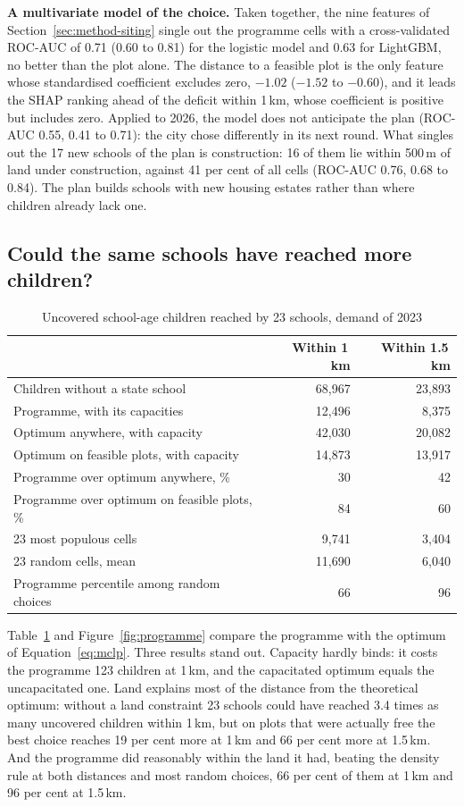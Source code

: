 \textbf{A multivariate model of the choice.} Taken together, the nine features of Section~\ref{sec:method-siting} single out the programme cells with a cross-validated ROC-AUC of 0.71 (0.60 to 0.81) for the logistic model and 0.63 for LightGBM, no better than the plot alone. The distance to a feasible plot is the only feature whose standardised coefficient excludes zero, $-1.02$ ($-1.52$ to $-0.60$), and it leads the SHAP ranking ahead of the deficit within 1\,km, whose coefficient is positive but includes zero. Applied to 2026, the model does not anticipate the plan (ROC-AUC 0.55, 0.41 to 0.71): the city chose differently in its next round. What singles out the 17 new schools of the plan is construction: 16 of them lie within 500\,m of land under construction, against 41 per cent of all cells (ROC-AUC 0.76, 0.68 to 0.84). The plan builds schools with new housing estates rather than where children already lack one.

\subsection{Could the same schools have reached more children?}

\begin{table}[ht]
\centering
\caption{Uncovered school-age children reached by 23 schools, demand of 2023}
\label{tab:backtest}
\small
\begin{tabular}{lrr}
\toprule
& Within 1\,km & Within 1.5\,km \\
\midrule
Children without a state school & 68,967 & 23,893 \\
Programme, with its capacities & 12,496 & 8,375 \\
Optimum anywhere, with capacity & 42,030 & 20,082 \\
Optimum on feasible plots, with capacity & 14,873 & 13,917 \\
Programme over optimum anywhere, \% & 30 & 42 \\
Programme over optimum on feasible plots, \% & 84 & 60 \\
23 most populous cells & 9,741 & 3,404 \\
23 random cells, mean & 11,690 & 6,040 \\
Programme percentile among random choices & 66 & 96 \\
\bottomrule
\end{tabular}
\end{table}

Table~\ref{tab:backtest} and Figure~\ref{fig:programme} compare the programme with the optimum of Equation~\eqref{eq:mclp}. Three results stand out. Capacity hardly binds: it costs the programme 123 children at 1\,km, and the capacitated optimum equals the uncapacitated one. Land explains most of the distance from the theoretical optimum: without a land constraint 23 schools could have reached 3.4 times as many uncovered children within 1\,km, but on plots that were actually free the best choice reaches 19 per cent more at 1\,km and 66 per cent more at 1.5\,km. And the programme did reasonably within the land it had, beating the density rule at both distances and most random choices, 66 per cent of them at 1\,km and 96 per cent at 1.5\,km.

